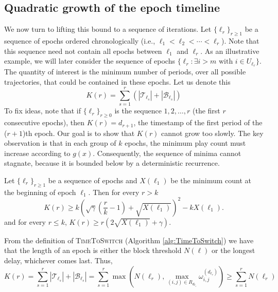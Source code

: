 \documentclass[opre,blindrev]{informs3}
\newcommand{\TimeToSwitch}{\textsc{TimeToSwitch}}
\begin{document}
\begin{APPENDICES}
\subsection{Quadratic growth of the epoch timeline}
We now turn to lifting this bound to a sequence of iterations. Let \(\{\ell_{r}\}_{r\geq 1}\) be a sequence of epochs ordered chronologically (i.e., \(\ell_{1}< \ell_{2}<\cdots < \ell_{r}\)). Note that this sequence need not contain all epochs between \(\ell_1\) and \(\ell_r\). As an illustrative example, we will later consider the sequence of epochs \(\{\ell_r :\exists i>m \text{ with } i\in U_{\ell_r}\}\). The quantity of interest is the minimum number of periods, over all possible trajectories, that could be contained in these epochs. Let us denote this
\[K(r)=\sum_{s=1}^r(|\mathcal{T}_{\ell_s}|+|\mathcal{B}_{\ell_s}|)\]
To fix ideas, note that if \(\{\ell_{r}\}_{r\geq 0}\) is the sequence \(1,2,\dots, r\) (the first \(r\) consecutive epochs), then \(K(r)=d_{r+1}\), the timestamp of the first period of the (\(r+1\))th epoch. Our goal is to show that \(K(r)\) cannot grow too slowly. The key observation is that in each group of \(k\) epochs, the minimum play count must increase according to \(g(x)\). Consequently, the sequence of minima cannot stagnate, because it is bounded below by a deterministic recurrence. 

\begin{lemma}\label{lem:ell-t-bound}
    Let \(\{\ell_{r}\}_{r\geq 1}\) be a sequence of epochs and \(X(\ell_1)\) be the minimum count at the beginning of epoch \(\ell_1\). Then for every  \(r > k\)
    \[
        K(r)
        \ge
        k\left(\sqrt{\gamma}\left(\frac{r}{k} - 1\right)+\sqrt{X(\ell_1)}\right)^2-kX(\ell_1).
    \]
    and for every \(r \leq k\), \(K(r) \geq r\left(2\sqrt{X(\ell_1)}+ \gamma\right)\).
\end{lemma}

    From the definition of \TimeToSwitch\,\,(Algorithm \ref{alg:TimeToSwitch}) we have that the length of an epoch is either the block threshold \(N(\ell)\) or the longest delay, whichever comes last. Thus,
    \[ K(r)=\sum_{s=1}^r|\mathcal{T}_{\ell_s}|+|\mathcal{B}_{\ell_s}|=\sum_{s=1}^r\max\left(N(\ell_r), \max_{(i,j)\in R_{d_{\ell_r}}}\omega_{i,j}^{(d_{\ell_r})}\right)\geq \sum_{s=1}^r N(\ell_r)
    \]
    

\end{APPENDICES}
\end{document}
